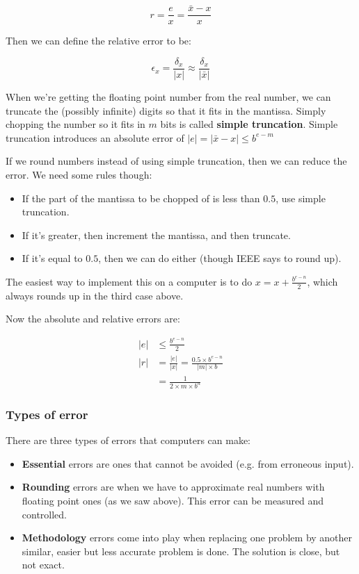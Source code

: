 \[
  r = \frac{e}{x} = \frac{\bar{x} - x}{x}
\]

Then we can define the relative error to be:

\[
  \epsilon_x = \frac{\delta_x}{|x|} \approx \frac{\delta_x}{|\bar{x}|}
\]

When we're getting the floating point number from the real number, we
can truncate the (possibly infinite) digits so that it fits in the
mantissa. Simply chopping the number so it fits in $m$ bits is
called \textbf{simple truncation}. Simple truncation introduces an
absolute error of $|e| = |\bar{x} - x| \leq b^{e-m}$

If we round numbers instead of using simple truncation, then we can reduce the
error. We need some rules though:

\begin{itemize}
\item If the part of the mantissa to be chopped of is less than $0.5$, use simple truncation.
\item If it's greater, then increment the mantissa, and then truncate.
\item If it's equal to $0.5$, then we can do either (though IEEE says to round up).
\end{itemize}

The easiest way to implement this on a computer is to do $x = x
+ \frac{b^{e-n}}{2}$, which always rounds up in the third case above.

Now the absolute and relative errors are:

\[
\begin{split}
  |e| &\leq \frac{b^{e-n}}{2}\\
  |r| &= \frac{|e|}{|x|} = \frac{0.5 \times b^{e-n}}{|m|\times b}\\
      &= \frac{1}{2 \times m \times b^n}
\end{split}
\]

\subsubsection{Types of error}

There are three types of errors that computers can make:

\begin{itemize}
  \item \textbf{Essential} errors are ones that cannot be avoided (e.g. from erroneous
  input).
  \item \textbf{Rounding} errors are when we have to approximate real numbers with
  floating point ones (as we saw above). This error can be measured and controlled.
  \item \textbf{Methodology} errors come into play when replacing one problem by another
  similar, easier but less accurate problem is done. The solution is close, but
  not exact.
\end{itemize}


